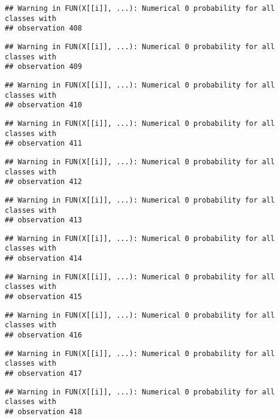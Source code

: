\documentclass[
]{article}
\begin{document}
\begin{verbatim}
## Warning in FUN(X[[i]], ...): Numerical 0 probability for all classes with
## observation 408
\end{verbatim}

\begin{verbatim}
## Warning in FUN(X[[i]], ...): Numerical 0 probability for all classes with
## observation 409
\end{verbatim}

\begin{verbatim}
## Warning in FUN(X[[i]], ...): Numerical 0 probability for all classes with
## observation 410
\end{verbatim}

\begin{verbatim}
## Warning in FUN(X[[i]], ...): Numerical 0 probability for all classes with
## observation 411
\end{verbatim}

\begin{verbatim}
## Warning in FUN(X[[i]], ...): Numerical 0 probability for all classes with
## observation 412
\end{verbatim}

\begin{verbatim}
## Warning in FUN(X[[i]], ...): Numerical 0 probability for all classes with
## observation 413
\end{verbatim}

\begin{verbatim}
## Warning in FUN(X[[i]], ...): Numerical 0 probability for all classes with
## observation 414
\end{verbatim}

\begin{verbatim}
## Warning in FUN(X[[i]], ...): Numerical 0 probability for all classes with
## observation 415
\end{verbatim}

\begin{verbatim}
## Warning in FUN(X[[i]], ...): Numerical 0 probability for all classes with
## observation 416
\end{verbatim}

\begin{verbatim}
## Warning in FUN(X[[i]], ...): Numerical 0 probability for all classes with
## observation 417
\end{verbatim}

\begin{verbatim}
## Warning in FUN(X[[i]], ...): Numerical 0 probability for all classes with
## observation 418
\end{verbatim}
\end{document}

